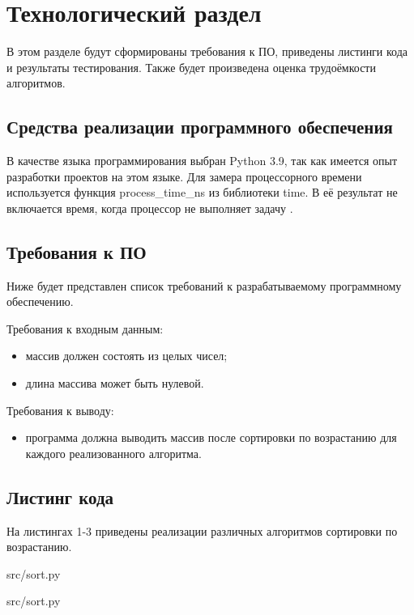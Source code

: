 \chapter{Технологический раздел}
В этом разделе будут сформированы требования к ПО, 
приведены листинги кода и результаты тестирования.
Также будет произведена оценка трудоёмкости алгоритмов.

\section{Средства реализации программного обеспечения}
В качестве языка программирования выбран Python 3.9, так как имеется опыт разработки проектов на этом языке.
Для замера процессорного времени используется функция process\_time\_ns из библиотеки time. 
В её результат не включается время, когда процессор не выполняет задачу \cite{python}. 

\section{Требования к ПО}
Ниже будет представлен список требований к разрабатываемому программному обеспечению. 

Требования к входным данным: 
\begin{itemize}
	\item массив должен состоять из целых чисел;
	\item длина массива может быть нулевой.
\end{itemize}

Требования к выводу: 
\begin{itemize}
	\item программа должна выводить массив после сортировки по возрастанию для каждого реализованного алгоритма.
\end{itemize} 

\section{Листинг кода}
На листингах 1-3 приведены реализации различных алгоритмов сортировки по возрастанию.
\begin{lstinputlisting}[language=Python, caption=Реализация алгоритма сортировки пузырьком, linerange={2-9}, 
	basicstyle=\small\sffamily, frame=single]{src/sort.py}
\end{lstinputlisting}

\begin{lstinputlisting}[language=Python, caption=Реализация алгоритма сортировки выбором, linerange={12-20}, 
	basicstyle=\small\sffamily, frame=single]{src/sort.py}
\end{lstinputlisting}

